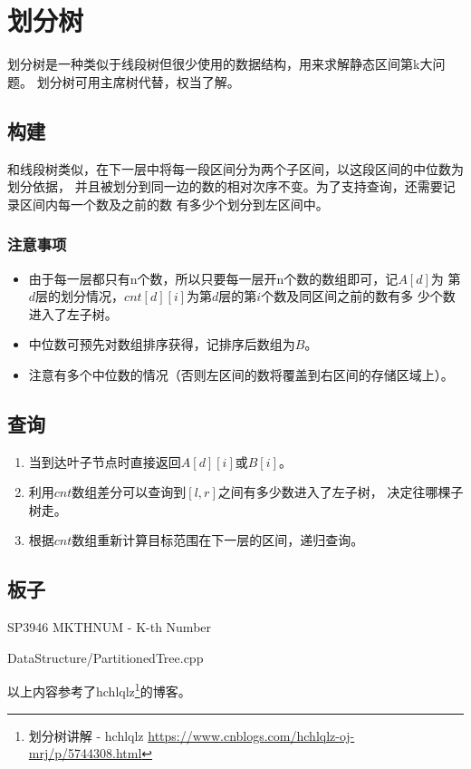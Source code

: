 \section{划分树}
划分树是一种类似于线段树但很少使用的数据结构，用来求解静态区间第k大问题。
划分树可用主席树代替，权当了解。
\subsection{构建}
和线段树类似，在下一层中将每一段区间分为两个子区间，以这段区间的中位数为划分依据，
并且被划分到同一边的数的相对次序不变。为了支持查询，还需要记录区间内每一个数及之前的数
有多少个划分到左区间中。
\subsubsection{注意事项}
\begin{itemize}
    \item 由于每一层都只有n个数，所以只要每一层开n个数的数组即可，记$A[d]$为
    第$d$层的划分情况，$cnt[d][i]$为第$d$层的第$i$个数及同区间之前的数有多
    少个数进入了左子树。
    \item 中位数可预先对数组排序获得，记排序后数组为$B$。
    \item 注意有多个中位数的情况（否则左区间的数将覆盖到右区间的存储区域上）。
\end{itemize}
\subsection{查询}

\begin{enumerate}
    \item 当到达叶子节点时直接返回$A[d][i]$或$B[i]$。
    \item 利用$cnt$数组差分可以查询到$[l,r]$之间有多少数进入了左子树，
    决定往哪棵子树走。
    \item 根据$cnt$数组重新计算目标范围在下一层的区间，递归查询。
\end{enumerate}

\subsection{板子}

SP3946 MKTHNUM - K-th Number


{DataStructure/PartitionedTree.cpp}

以上内容参考了hchlqlz\footnote{划分树讲解 - hchlqlz
\url{https://www.cnblogs.com/hchlqlz-oj-mrj/p/5744308.html}}的博客。
